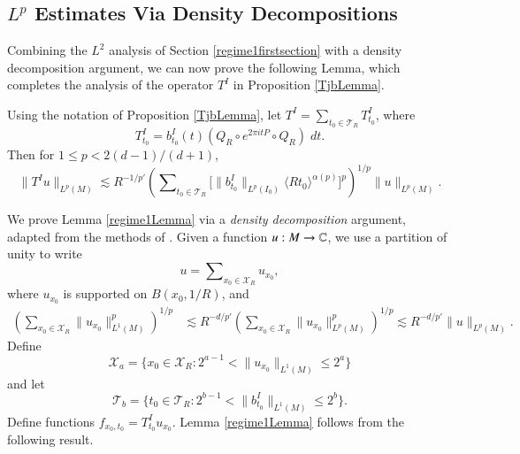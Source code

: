 \subsection{$L^p$ Estimates Via Density Decompositions} \label{regime1densitydecomposition}

Combining the $L^2$ analysis of Section \ref{regime1firstsection} with a density decomposition argument, we can now prove the following Lemma, which completes the analysis of the operator $T^I$ in Proposition \ref{TjbLemma}.

\begin{lemma} \label{regime1Lemma}
    Using the notation of Proposition \ref{TjbLemma}, let $T^I = \sum\nolimits_{t_0 \in \mathcal{T}_R} T^I_{t_0}$, where
    \begin{equation}
        T^I_{t_0} = b_{t_0}^I(t) (Q_R \circ e^{2 \pi i t P} \circ Q_R)\; dt.
    \end{equation}
    Then for $1 \leq p < 2 (d-1) / (d+1)$,
    \begin{equation}
        \| T^I u \|_{L^p(M)} \lesssim R^{-1/p'} \left( \sum\nolimits_{t_0 \in \mathcal{T}_R} \Big[ \| b^I_{t_0} \|_{L^p(I_0)} \langle R t_0 \rangle^{\alpha(p)} \Big]^p \right)^{1/p} \| u \|_{L^p(M)}.
    \end{equation}
\end{lemma}

We prove Lemma \ref{regime1Lemma} via a \emph{density decomposition} argument, adapted from the methods of \cite{HeoandNazarovandSeeger}. Given a function $u: M \to \operatorname{\mathbb{C}}$, we use a partition of unity to write
%
\begin{equation}
    u = \sum\nolimits_{x_0 \in \mathcal{X}_R} u_{x_0},
\end{equation}
%
where $u_{x_0}$ is supported on $B(x_0,1/R)$, and
%
\begin{equation}
\begin{split}
    \left( \sum\nolimits_{x_0 \in \mathcal{X}_R} \| u_{x_0} \|_{L^1(M)}^p \right)^{1/p} &\lesssim R^{-d/p'} \left( \sum\nolimits_{x_0 \in \mathcal{X}_R} \| u_{x_0} \|_{L^p(M)}^p \right)^{1/p} \lesssim R^{-d/p'} \| u \|_{L^p(M)}.
\end{split}
\end{equation}
Define
%
\begin{equation}
    \mathcal{X}_{a} = \{ x_0 \in \mathcal{X}_R: 2^{a-1} < \| u_{x_0} \|_{L^1(M)} \leq 2^a \}
\end{equation}
%
and let
%
\begin{equation}
    \mathcal{T}_{b} = \{ t_0 \in \mathcal{T}_R: 2^{b-1} < \| b_{t_0}^I \|_{L^1(M)} \leq 2^b \}.
\end{equation}
%
Define functions $f_{x_0,t_0} = T_{t_0}^I u_{x_0}$. Lemma \ref{regime1Lemma} follows from the following result.

